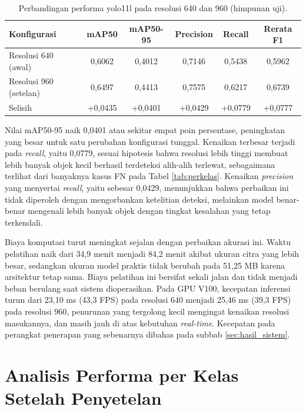 \begin{table}[htbp]
    \centering
    \caption{Perbandingan performa yolo11l pada resolusi 640 dan 960 (himpunan uji).}
    \label{tab:perbandingan_penyetelan}
    \begin{tabular}{lccccc}
        \hline
        \textbf{Konfigurasi} & \textbf{mAP50} & \textbf{mAP50-95} & \textbf{Precision} & \textbf{Recall} & \textbf{Rerata F1} \\
        \hline \hline
        Resolusi 640 (awal) & 0,6062 & 0,4012 & 0,7146 & 0,5438 & 0,5962 \\
        Resolusi 960 (setelan) & 0,6497 & 0,4413 & 0,7575 & 0,6217 & 0,6739 \\
        \hline
        Selisih & +0,0435 & +0,0401 & +0,0429 & +0,0779 & +0,0777 \\
        \hline
    \end{tabular}
\end{table}

Nilai mAP50-95 naik 0,0401 atau sekitar empat poin persentase, peningkatan yang besar untuk 
satu perubahan konfigurasi tunggal. Kenaikan terbesar terjadi pada 
\textit{recall}, yaitu 0,0779, sesuai hipotesis bahwa resolusi lebih tinggi membuat lebih 
banyak objek kecil berhasil terdeteksi alih-alih terlewat, sebagaimana terlihat dari 
banyaknya kasus FN pada Tabel \ref{tab:perkelas}. Kenaikan \textit{precision} yang menyertai 
\textit{recall}, yaitu sebesar 0,0429, menunjukkan bahwa perbaikan ini tidak diperoleh 
dengan mengorbankan ketelitian deteksi, melainkan model benar-benar mengenali lebih banyak 
objek dengan tingkat kesalahan yang tetap terkendali.

Biaya komputasi turut meningkat sejalan dengan perbaikan akurasi ini. Waktu pelatihan naik 
dari 34,9 menit menjadi 84,2 menit akibat ukuran citra yang lebih besar, sedangkan ukuran 
model praktis tidak berubah pada 51,25 MB karena arsitektur tetap sama. Biaya pelatihan ini 
bersifat sekali jalan dan tidak menjadi beban berulang saat sistem dioperasikan. Pada GPU 
V100, kecepatan inferensi turun dari 23,10 ms (43,3 FPS) pada resolusi 640 menjadi 25,46 ms 
(39,3 FPS) pada resolusi 960, penurunan yang tergolong kecil mengingat kenaikan resolusi 
masukannya, dan masih jauh di atas kebutuhan \textit{real-time}. Kecepatan pada perangkat 
penerapan yang sebenarnya dibahas pada subbab \ref{sec:hasil_sistem}.

\section{Analisis Performa per Kelas Setelah Penyetelan}
\label{sec:hasil_penyetelan_perkelas}

